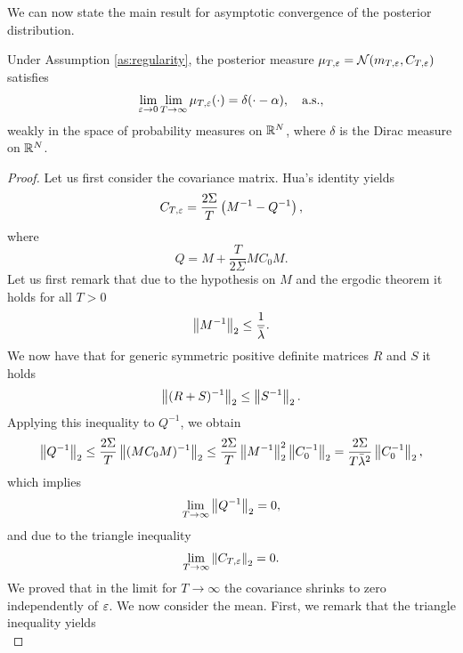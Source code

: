 \documentclass[10pt]{article}
\begin{document}
We can now state the main result for asymptotic convergence of the posterior distribution.
\begin{theorem}\label{thm:BayesianBias} Under Assumption \ref{as:regularity}, the posterior measure $\mu_{T,\varepsilon} = \mathcal N(m_{T,\varepsilon}, C_{T,\varepsilon})$ satisfies
	\begin{equation}
		\lim_{\varepsilon \to 0}\lim_{T \to \infty} \mu_{T,\varepsilon}(\cdot) = \delta(\cdot - \alpha), \quad \text{a.s.},
	\end{equation}
	weakly in the space of probability measures on $\mathbb{R}^N$, where $\delta$ is the Dirac measure on $\mathbb{R}^N$.
\end{theorem}
\begin{proof} Let us first consider the covariance matrix. Hua's identity yields
	\begin{equation}
	C_{T,\varepsilon} = \frac{2\Sigma}{T} \left(M^{-1} - Q^{-1}\right),
	\end{equation}
	where 
	\begin{equation}
	Q = M + \frac{T}{2\Sigma} M C_0 M.
	\end{equation}
	Let us first remark that due to the hypothesis on $M$ and the ergodic theorem it holds for all $T > 0$
	\begin{equation}
		\left\|M^{-1}\right\|_2 \leq \frac1{\bar \lambda}.
	\end{equation}
	We now have that for generic symmetric positive definite matrices $R$ and $S$ it holds
	\begin{equation}
		\left\|(R+S)^{-1}\right\|_2 \leq \left\|S^{-1}\right\|_2.
	\end{equation}
	Applying this inequality to $Q^{-1}$, we obtain
	\begin{equation}
		\left\|Q^{-1}\right\|_2 \leq \frac{2\Sigma}T \left\|(MC_0M)^{-1}\right\|_2 \leq \frac{2\Sigma}T \left\|M^{-1}\right\|_2^2 \left\|C_0^{-1}\right\|_2 = \frac{2\Sigma}{T\bar \lambda^2} \left\|C_0^{-1}\right\|_2,
	\end{equation}
	which implies
	\begin{equation}
		\lim_{T \to \infty}\left\|Q^{-1}\right\|_2 = 0,
	\end{equation}
	and due to the triangle inequality
	\begin{equation}\label{eq:CovarianceShrink}
		\lim_{T \to \infty}\left\|C_{T,\varepsilon}\right\|_2 = 0.
	\end{equation}
	We proved that in the limit for $T \to \infty$ the covariance shrinks to zero independently of $\varepsilon$. We now consider the mean. First, we remark that the triangle inequality yields
	\begin{equation}

\end{equation}
\end{proof}
\end{document}
